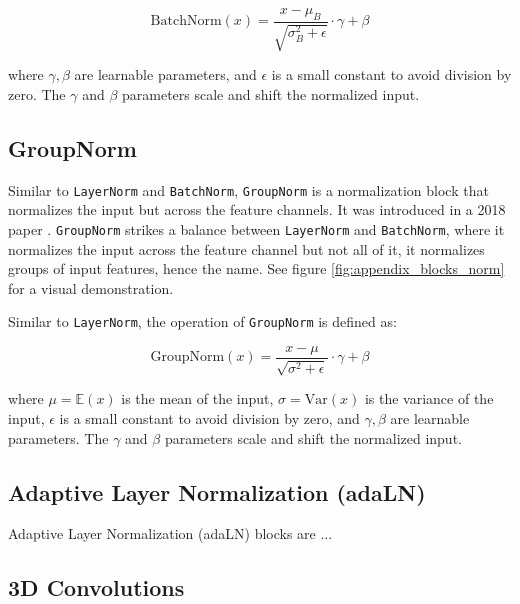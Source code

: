 \begin{equation*}
    \text{BatchNorm}(x) = \frac{x - \mu_B}{\sqrt{\sigma^2_B + \epsilon}} \cdot \gamma + \beta
\end{equation*}

where $\gamma, \beta$ are learnable parameters, and $\epsilon$ is a small constant to avoid division by zero. The $\gamma$ and $\beta$ parameters scale and shift the normalized input.








\subsection*{GroupNorm}

Similar to \texttt{LayerNorm} and \texttt{BatchNorm}, \texttt{GroupNorm} is a normalization block that normalizes the input but across the feature channels. It was introduced in a 2018 paper \cite{wu2018group}. \texttt{GroupNorm} strikes a balance between \texttt{LayerNorm} and \texttt{BatchNorm}, where it normalizes the input across the feature channel but not all of it, it normalizes groups of input features, hence the name. See figure \ref{fig:appendix_blocks_norm} for a visual demonstration.

Similar to \texttt{LayerNorm}, the operation of \texttt{GroupNorm} is defined as:

\begin{equation*}
    \text{GroupNorm}(x) = \frac{x - \mu}{\sqrt{\sigma^2 + \epsilon}} \cdot \gamma + \beta
\end{equation*}

where $\mu = \mathbb{E}(x)$ is the mean of the input, $\sigma = \text{Var} (x)$ is the variance of the input, $\epsilon$ is a small constant to avoid division by zero, and $\gamma, \beta$ are learnable parameters. The $\gamma$ and $\beta$ parameters scale and shift the normalized input.




\subsection*{Adaptive Layer Normalization (adaLN)}

Adaptive Layer Normalization (adaLN) blocks are ...






\subsection{3D Convolutions}
\label{appendix:blocks_3dconv}

